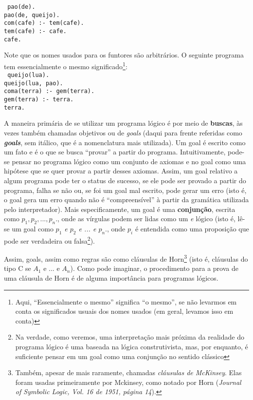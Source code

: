\documentclass{article}
\theoremstyle{definition}
\theoremstyle{remark}
\begin{document}
{\tt
  pao(de).\\
  pao(de, queijo).\\
  com(cafe) :- tem(cafe).\\
  tem(cafe) :- cafe.\\
  cafe.
}

Note que os nomes usados para os funtores são arbitrários. O seguinte programa tem essencialmente o mesmo significado\footnote{ Aqui, ``Essencialmente o mesmo'' significa ``o mesmo'', se não levarmos em conta os significados usuais dos nomes usados (em geral, levamos isso em conta)}:\\

{\tt
  queijo(lua).\\
  queijo(lua, pao).\\
  coma(terra) :- gem(terra).\\
  gem(terra) :- terra.\\
  terra.
}

A maneira primária de se utilizar um programa lógico é por meio de \textbf{buscas}, às vezes também chamadas objetivos ou de \textit{goals} (daqui para frente referidas como \textbf{\textit{goals}}, sem itálico, que é a nomenclatura mais utilizada). Um goal é escrito como um fato e é o que se busca ``provar'' a partir do programa. Intuitivamente, pode-se pensar no programa lógico como um conjunto de axiomas e no goal como uma hipótese que se quer provar a partir desses axiomas. Assim, um goal
relativo a algum programa pode ter o status de sucesso, se ele pode ser provado a partir do programa, falha se não ou, se foi um goal mal escrito, pode gerar um erro (isto é, o goal gera um erro quando não é ``compreensível'' à partir da gramática utilizada pelo interpretador). Mais especificamente, um goal é uma \textbf{conjunção}, escrita como \textit{$p_1,p_2,...,p_n.$}, onde as vírgulas podem ser lidas como um \textit{e} lógico (isto é, lê-se um goal como \textit{$p_1$ e $p_2$ e ... e
  $p_n.$}, onde $p_i$ é
entendida como uma proposição que pode ser verdadeira ou falsa\footnote{Na verdade, como veremos, uma interpretação mais próxima da realidade do programa lógico é uma baseada na lógica construtivista, mas, por enquanto, é suficiente pensar em um goal como uma conjunção no sentido clássico}).

Assim, goals, assim como regras são como cláusulas de Horn\footnote{Também, apesar de mais raramente, chamadas \textit{cláusulas de McKinsey}. Elas foram usadas primeiramente por Mckinsey, como notado por Horn (\textit{Journal of Symbolic Logic, Vol. 16 de 1951, página 14}).} (isto é, cláusulas do tipo C se $A_1$ e ... e $A_n$). Como pode imaginar, o procedimento para a prova de uma cláusula de Horn é de alguma importância para programas lógicos.
\end{document}
